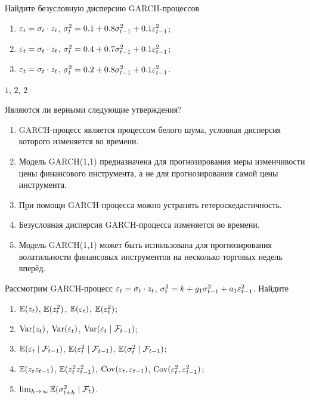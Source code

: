 \begin{problem}
Найдите безусловную дисперсию GARCH-процессов
\begin{enumerate}
\item $\varepsilon_t=\sigma_t \cdot z_t$, $\sigma^2_t=0.1+0.8\sigma^2_{t-1}+0.1\varepsilon^2_{t-1}$;
\item $\varepsilon_t=\sigma_t \cdot z_t$, $\sigma^2_t=0.4+0.7\sigma^2_{t-1}+0.1\varepsilon^2_{t-1}$;
\item $\varepsilon_t=\sigma_t \cdot z_t$, $\sigma^2_t=0.2+0.8\sigma^2_{t-1}+0.1\varepsilon^2_{t-1}$.
\end{enumerate}


\begin{sol}
$1$, $2$, $2$
\end{sol}
\end{problem}



\begin{problem}
Являются ли верными следующие утверждения?
\begin{enumerate}
\item GARCH-процесс является процессом белого шума, условная дисперсия которого
изменяется во времени.
\item Модель GARCH(1,1) предназначена для прогнозирования меры изменчивости цены
финансового инструмента, а не для прогнозирования самой цены инструмента.
\item При помощи GARCH-процесса можно устранять гетероскедастичность.
\item Безусловная дисперсия GARCH-процесса изменяется во времени.
\item Модель GARCH(1,1) может быть использована для прогнозирования
волатильности финансовых инструментов на несколько торговых недель вперёд.
\end{enumerate}


\begin{sol}
\end{sol}
\end{problem}



\begin{problem}
Рассмотрим GARCH-процесс $\varepsilon_t=\sigma_t \cdot z_t$, $\sigma^2_t=k+g_1\sigma^2_{t-1}+a_1\varepsilon^2_{t-1}$. Найдите
\begin{enumerate}
\item $\mathbb{E}(z_t)$, $\mathbb{E}(z_t^2)$, $\mathbb{E}(\varepsilon_t)$, $\mathbb{E}(\varepsilon_t^2)$;
\item $\operatorname{Var}(z_t)$, $\operatorname{Var}(\varepsilon_t)$, $\operatorname{Var}(\varepsilon_t \mid \mathcal{F}_{t-1})$;
\item $\mathbb{E}(\varepsilon_t \mid \mathcal{F}_{t-1})$, $\mathbb{E}(\varepsilon_t^2 \mid \mathcal{F}_{t-1})$, $\mathbb{E}(\sigma^2_t \mid \mathcal{F}_{t-1})$;
\item $\mathbb{E}(z_tz_{t-1})$, $\mathbb{E}(z_t^2z_{t-1}^2)$, $\operatorname{Cov}(\varepsilon_t,\varepsilon_{t-1})$, $\operatorname{Cov}(\varepsilon_t^2,\varepsilon_{t-1}^2)$;
\item $\lim_{h\rightarrow\infty} \mathbb{E}(\sigma^2_{t+h} \mid \mathcal{F}_t)$.
\end{enumerate}


\begin{sol}
\end{sol}
\end{problem}



